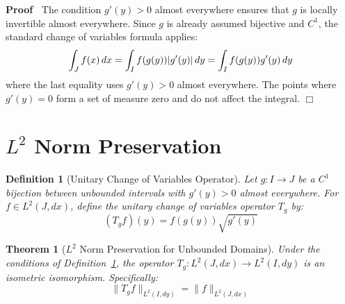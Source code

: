 \documentclass{article}
\newenvironment{proof}{\noindent\textbf{Proof\ }}{\hspace*{\fill}$\Box$\medskip}
\newtheorem{definition}{Definition}
\newtheorem{theorem}{Theorem}
\begin{document}
\begin{proof}
  The condition $g' (y) > 0$ almost everywhere ensures that $g$ is locally
  invertible almost everywhere. Since $g$ is already assumed bijective and
  $C^1$, the standard change of variables formula applies:
  \begin{equation}
    \label{eq:change_vars} \int_J f (x)  \hspace{0.17em} dx = \int_I f (g (y))
    |g' (y) |  \hspace{0.17em} dy = \int_I f (g (y)) g' (y)  \hspace{0.17em}
    dy
  \end{equation}
  where the last equality uses $g' (y) > 0$ almost everywhere. The points
  where $g' (y) = 0$ form a set of measure zero and do not affect the
  integral.
\end{proof}

\section{$L^2$ Norm Preservation}

\begin{definition}[Unitary Change of Variables Operator]
  \label{def:unitary_transform}Let $g : I \to J$ be a $C^1$ bijection between
  unbounded intervals with $g' (y) > 0$ almost everywhere. For $f \in L^2 (J,
  dx)$, define the unitary change of variables operator $T_g$ by:
  \begin{equation}
    \label{eq:unitary_transform} (T_g f) (y) = f (g (y)) \sqrt{g' (y)}
  \end{equation}
\end{definition}

\begin{theorem}[$L^2$ Norm Preservation for Unbounded Domains]
  \label{thm:l2_preservation}Under the conditions of
  Definition~\ref{def:unitary_transform}, the operator $T_g : L^2 (J, dx) \to
  L^2 (I, dy)$ is an isometric isomorphism. Specifically:
  \begin{equation}
    \label{eq:norm_equality} \|T_g f\|_{L^2 (I, dy)} = \|f\|_{L^2 (J, dx)}
  \end{equation}
\end{theorem}
\end{document}
